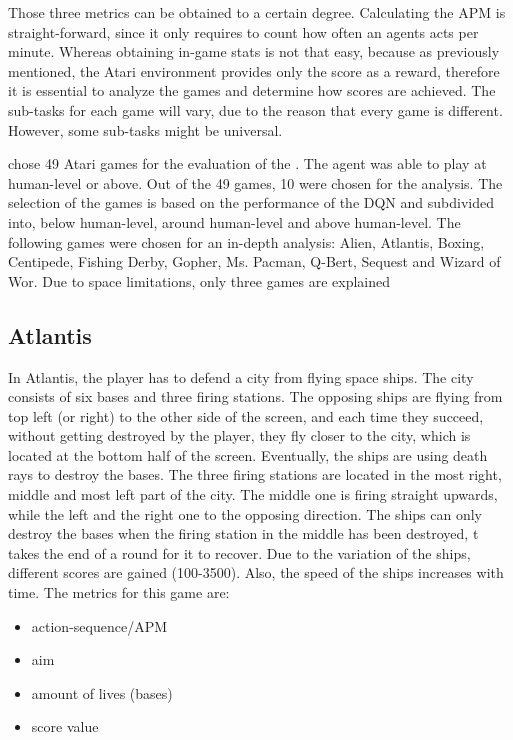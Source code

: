 Those three metrics can be obtained to a certain degree. Calculating the APM is straight-forward, since it only requires to count how often an agents acts per minute. Whereas obtaining in-game stats is not that easy, because as previously mentioned, the Atari environment provides only the score as a reward, therefore it is essential to analyze the games and determine how scores are achieved. The sub-tasks for each game will vary, due to the reason that every game is different. However, some sub-tasks might be universal.

 chose 49 Atari games for the evaluation of the . The agent was able to play at human-level or above. Out of the 49 games, 10 were chosen for the analysis. The selection of the games is based on the performance of the DQN and subdivided into, below human-level, around human-level and above human-level. The following games were chosen for an in-depth analysis: Alien, Atlantis, Boxing, Centipede, Fishing Derby, Gopher, Ms. Pacman, Q-Bert, Sequest and Wizard of Wor.
Due to space limitations, only three games are explained
\subsection{Atlantis}
In Atlantis, the player has to defend a city from flying space ships. The city consists of six bases and three firing stations. The opposing ships are flying from top left (or right) to the other side of the screen, and each time they succeed, without getting destroyed by the player, they fly closer to the city, which is located at the bottom half of the screen. Eventually, the ships are using death rays to destroy the bases. The three firing stations are located in the most right, middle and most left part of the city. The middle one is firing straight upwards, while the left and the right one to the opposing direction. The ships can only destroy the bases when the firing station in the middle has been destroyed, t takes the end of a round for it to recover. Due to the variation of the ships, different scores are gained (100-3500). Also, the speed of the ships increases with time. The metrics for this game are:
\begin{itemize}
	\item action-sequence/APM
	\item aim
	\item amount of lives (bases)
	\item score value
\end{itemize}

